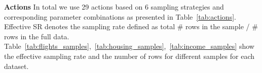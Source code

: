 \noindent\textbf{Actions}
%
In total we use 29 actions based on 6 sampling strategies and corresponding parameter combinations as presented in Table~\ref{tab:actions}.
Effective SR denotes the sampling rate defined as total \# rows in the sample / \# rows in the full data. Table~\ref{tab:flights_samples},~\ref{tab:housing_samples},~\ref{tab:income_samples} show the effective sampling rate and the number of rows for different samples for each dataset.
%

%

